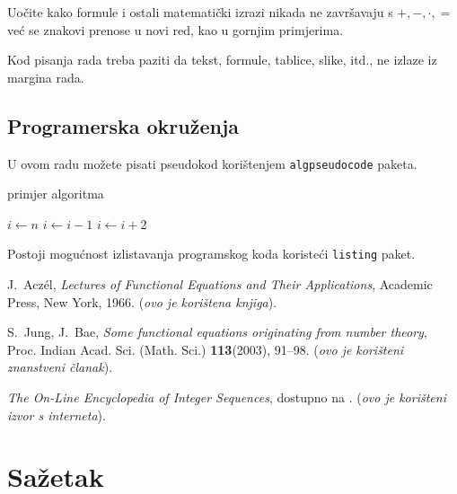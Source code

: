 \documentclass{mathos}
\begin{document}
\noindent
Uočite kako formule i ostali matematički izrazi nikada ne završavaju s $+,-,\cdot,=$ već se znakovi prenose u novi red, kao u gornjim primjerima.

\noindent
Kod pisanja rada treba paziti da tekst, formule, tablice, slike, itd., ne izlaze iz margina rada.

\section{Programerska okruženja}

U ovom radu možete pisati pseudokod korištenjem \verb+algpseudocode+ paketa.

\begin{algorithm}
\caption{primjer algoritma}
\begin{algorithmic}[1]
\State $i \gets n$
    \State $i \gets i-1$
\Else
        \State $i \gets i+2$
    \EndIf
\EndIf
\EndProcedure
\end{algorithmic}
\end{algorithm}

\noindent
Postoji mogućnost izlistavanja programskog koda koristeći \verb+listing+ paket.





\begin{thebibliography}{30}
{\sc J.~Acz\'{e}l}, {\em Lectures of Functional Equations and Their Applications}, Academic Press, New York, 1966. ({\it ovo je korištena knjiga}).

{\sc S.~Jung, J.~Bae}, {\em  Some functional equations originating from number theory}, Proc. Indian Acad. Sci. (Math. Sci.) {\bf{113}}(2003), 91--98.
({\it ovo je korišteni znanstveni članak}).

\bibitem{ } {\em The On-Line Encyclopedia of Integer Sequences}, dostupno na . ({\it ovo je korišteni izvor s interneta}).
\end{thebibliography}




\chapter*{Sažetak}
\end{document}
